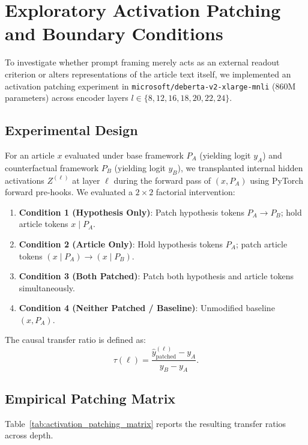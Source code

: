 \newpage

\section{Exploratory Activation Patching and Boundary Conditions}
\label{app:activation_patching}

\begin{center}
\end{center}

To investigate whether prompt framing merely acts as an external readout criterion or alters representations of the article text itself, we implemented an activation patching experiment in \texttt{microsoft/deberta-v2-xlarge-mnli} (860M parameters) across encoder layers $l \in \{8, 12, 16, 18, 20, 22, 24\}$.

\subsection{Experimental Design}
For an article $x$ evaluated under base framework $P_A$ (yielding logit $y_A$) and counterfactual framework $P_B$ (yielding logit $y_B$), we transplanted internal hidden activations $Z^{(\ell)}$ at layer $\ell$ during the forward pass of $(x, P_A)$ using PyTorch forward pre-hooks. We evaluated a $2 \times 2$ factorial intervention:
\begin{enumerate}
    \item \textbf{Condition 1 (Hypothesis Only)}: Patch hypothesis tokens $P_A \to P_B$; hold article tokens $x \mid P_A$.
    \item \textbf{Condition 2 (Article Only)}: Hold hypothesis tokens $P_A$; patch article tokens $(x \mid P_A) \to (x \mid P_B)$.
    \item \textbf{Condition 3 (Both Patched)}: Patch both hypothesis and article tokens simultaneously.
    \item \textbf{Condition 4 (Neither Patched / Baseline)}: Unmodified baseline $(x, P_A)$.
\end{enumerate}
The causal transfer ratio is defined as:
\begin{equation}
    \tau(\ell) = \frac{\hat{y}_{\text{patched}}^{(\ell)} - y_A}{y_B - y_A}.
\end{equation}

\subsection{Empirical Patching Matrix}
Table~\ref{tab:activation_patching_matrix} reports the resulting transfer ratios across depth.

